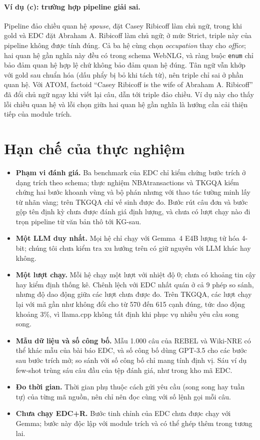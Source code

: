 \paragraph*{Ví dụ (c): trường hợp pipeline giải sai.}
Pipeline đảo chiều quan hệ \textit{spouse}, đặt Casey Ribicoff làm chủ ngữ, trong khi gold và EDC đặt Abraham A. Ribicoff làm chủ ngữ; ở mức Strict, triple này của pipeline không được tính đúng.
Cả ba hệ cùng chọn \textit{occupation} thay cho \textit{office}; hai quan hệ gần nghĩa này đều có trong schema WebNLG, và ràng buộc \texttt{enum} chỉ bảo đảm quan hệ hợp lệ chứ không bảo đảm quan hệ đúng.
Tân ngữ vẫn khớp với gold sau chuẩn hóa (dấu phẩy bị bỏ khi tách từ), nên triple chỉ sai ở phần quan hệ. Với ATOM, factoid ``Casey Ribicoff is the wife of Abraham A. Ribicoff'' đã đổi chủ ngữ ngay khi viết lại câu, dẫn tới triple đảo chiều.
Ví dụ này cho thấy lỗi chiều quan hệ và lỗi chọn giữa hai quan hệ gần nghĩa là hướng cần cải thiện tiếp của module trích.

\section{Hạn chế của thực nghiệm}\label{sec:exp-limits}

\begin{itemize}
  \item \textbf{Phạm vi đánh giá.} Ba benchmark của EDC chỉ kiểm chứng bước trích ở dạng trích theo schema; thực nghiệm NBAtransactions và TKGQA kiểm chứng hai bước khoanh vùng và bộ phán nhưng với thao tác tường minh lấy từ nhãn vàng; trên TKGQA chỉ vế sinh được đo. Bước rút câu đơn và bước gộp tên định kỳ chưa được đánh giá định lượng, và chưa có lượt chạy nào đi trọn pipeline từ văn bản thô tới KG-sau.
  \item \textbf{Một LLM duy nhất.} Mọi hệ chỉ chạy với Gemma~4 E4B lượng tử hóa 4-bit; chúng tôi chưa kiểm tra xu hướng trên có giữ nguyên với LLM khác hay không.
  \item \textbf{Một lượt chạy.} Mỗi hệ chạy một lượt với nhiệt độ 0; chưa có khoảng tin cậy hay kiểm định thống kê. Chênh lệch với EDC nhất quán ở cả 9 phép so sánh, nhưng độ dao động giữa các lượt chưa được đo. Trên TKGQA, các lượt chạy lại với mã gần như không đổi cho từ 570 đến 615 cạnh đúng, tức dao động khoảng 3\%, vì llama.cpp không tất định khi phục vụ nhiều yêu cầu song song.
  \item \textbf{Mẫu dữ liệu và số công bố.} Mẫu 1.000 câu của REBEL và Wiki-NRE có thể khác mẫu của bài báo EDC, và số công bố dùng GPT-3.5 cho các bước sau bước trích mở; so sánh với số công bố chỉ mang tính định vị. Sáu ví dụ few-shot trùng sáu câu đầu của tệp đánh giá, như trong kho mã EDC.
  \item \textbf{Đo thời gian.} Thời gian phụ thuộc cách gửi yêu cầu (song song hay tuần tự) của từng mã nguồn, nên chỉ nên đọc cùng với số lệnh gọi mỗi câu.
  \item \textbf{Chưa chạy EDC+R.} Bước tinh chỉnh của EDC chưa được chạy với Gemma; bước này độc lập với module trích và có thể ghép thêm trong tương lai.
\end{itemize}

